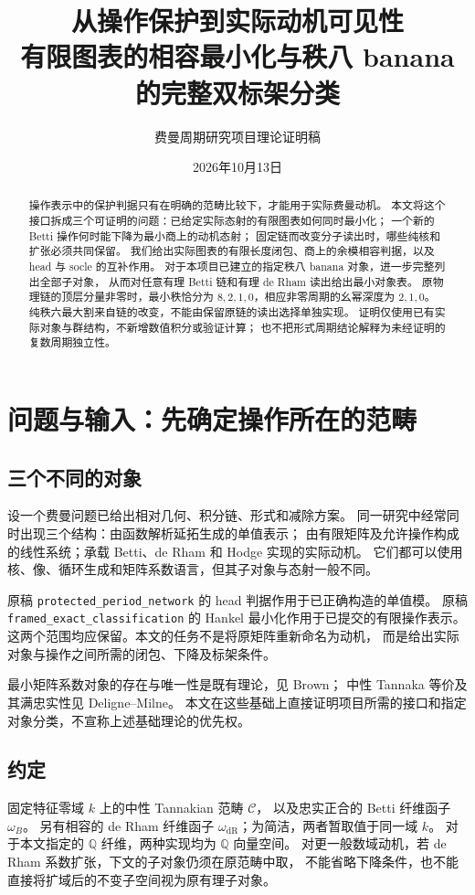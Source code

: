 \documentclass[11pt,a4paper]{ctexart}
\title{从操作保护到实际动机可见性\\[5pt]
\large 有限图表的相容最小化与秩八 banana 的完整双标架分类}
\author{费曼周期研究项目\quad 理论证明稿}
\date{2026年10月13日}
\theoremstyle{cnplain}
\theoremstyle{definition}
\theoremstyle{remark}
\newcommand{\Q}{\mathbb Q}
\newcommand{\dR}{\mathrm{dR}}
\begin{document}
\maketitle
\begin{abstract}
操作表示中的保护判据只有在明确的范畴比较下，才能用于实际费曼动机。
本文将这个接口拆成三个可证明的问题：已给定实际态射的有限图表如何同时最小化；
一个新的 Betti 操作何时能下降为最小商上的动机态射；
固定链而改变分子读出时，哪些纯核和扩张必须共同保留。
我们给出实际图表的有限长度闭包、商上的余模相容判据，以及 head 与 socle 的互补作用。
对于本项目已建立的指定秩八 banana 对象，进一步完整列出全部子对象，
从而对任意有理 Betti 链和有理 de Rham 读出给出最小对象表。
原物理链的顶层分量非零时，最小秩恰分为 $8,2,1,0$，相应非零周期的幺幂深度为 $2,1,0$。
纯秩六最大割来自链的改变，不能由保留原链的读出选择单独实现。
证明仅使用已有实际对象与群结构，不新增数值积分或验证计算；
也不把形式周期结论解释为未经证明的复数周期独立性。
\end{abstract}
\tableofcontents

\section{问题与输入：先确定操作所在的范畴}
\subsection{三个不同的对象}
设一个费曼问题已给出相对几何、积分链、形式和减除方案。
同一研究中经常同时出现三个结构：由函数解析延拓生成的单值表示；
由有限矩阵及允许操作构成的线性系统；承载 Betti、de Rham 和 Hodge 实现的实际动机。
它们都可以使用核、像、循环生成和矩阵系数语言，但其子对象与态射一般不同。

原稿 \nolinkurl{protected_period_network} 的 head 判据作用于已正确构造的单值模。
原稿 \nolinkurl{framed_exact_classification} 的 Hankel 最小化作用于已提交的有限操作表示。
这两个范围均应保留。本文的任务不是将原矩阵重新命名为动机，
而是给出实际对象与操作之间所需的闭包、下降及标架条件。

最小矩阵系数对象的存在与唯一性是既有理论，见 Brown\cite[\S2.4]{brown}；
中性 Tannaka 等价及其满忠实性见 Deligne--Milne\cite[Theorem 2.11]{dm}。
本文在这些基础上直接证明项目所需的接口和指定对象分类，不宣称上述基础理论的优先权。

\subsection{约定}
固定特征零域 $k$ 上的中性 Tannakian 范畴 $\mathcal C$，
以及忠实正合的 Betti 纤维函子 $\omega_B$。
另有相容的 de Rham 纤维函子 $\omega_{\dR}$；为简洁，两者暂取值于同一域 $k$。
对于本文指定的 $\Q$ 纤维，两种实现均为 $\Q$ 向量空间。
对更一般数域动机，若 de Rham 系数扩张，下文的子对象仍须在原范畴中取，
不能省略下降条件，也不能直接将扩域后的不变子空间视为原有理子对象。
\end{document}
